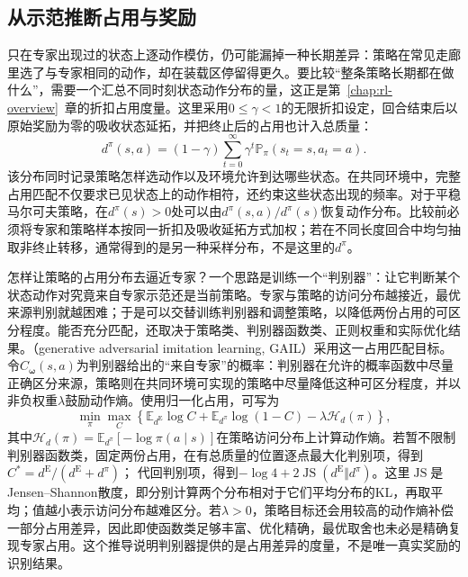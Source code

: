 \subsection{从示范推断占用与奖励}
\label{sec:rl-reward-occupancy-irl}

只在专家出现过的状态上逐动作模仿，仍可能漏掉一种长期差异：策略在常见走廊里选了与专家相同的动作，却在装载区停留得更久。要比较“整条策略长期都在做什么”，需要一个汇总不同时刻状态动作分布的量，这正是第~\ref{chap:rl-overview}~章的折扣占用度量。这里采用$0\leq\gamma<1$的无限折扣设定，回合结束后以原始奖励为零的吸收状态延拓，并把终止后的占用也计入总质量：
\begin{equation}
  d^\pi(s,a)=(1-\gamma)\sum_{t=0}^{\infty}
       \gamma^t\mathbb P_\pi(s_t=s,a_t=a).
  \label{eq:rl-reward-occupancy}
\end{equation}
该分布同时记录策略怎样选动作以及环境允许到达哪些状态。在共同环境中，完整占用匹配不仅要求已见状态上的动作相符，还约束这些状态出现的频率。对于平稳马尔可夫策略，在$d^\pi(s)>0$处可以由$d^\pi(s,a)/d^\pi(s)$恢复动作分布。比较前必须将专家和策略样本按同一折扣及吸收延拓方式加权；若在不同长度回合中均匀抽取非终止转移，通常得到的是另一种采样分布，不是这里的$d^\pi$。

怎样让策略的占用分布去逼近专家？一个思路是训练一个“判别器”：让它判断某个状态动作对究竟来自专家示范还是当前策略。专家与策略的访问分布越接近，最优来源判别就越困难；于是可以交替训练判别器和调整策略，以降低两份占用的可区分程度。能否充分匹配，还取决于策略类、判别器函数类、正则权重和实际优化结果。（generative adversarial imitation learning, GAIL）采用这一占用匹配目标。令$C_{\bm\omega}(s,a)$为判别器给出的“来自专家”的概率：判别器在允许的概率函数中尽量正确区分来源，策略则在共同环境可实现的策略中尽量降低这种可区分程度，并以非负权重$\lambda$鼓励动作熵。使用归一化占用，可写为
\begin{equation}
  \min_\pi\max_C
  \left\{\mathbb E_{d^{\mathrm E}}\log C
    +\mathbb E_{d^\pi}\log(1-C)
    -\lambda\mathcal H_d(\pi)\right\},
  \label{eq:rl-reward-gail}
\end{equation}
其中$\mathcal H_d(\pi)=\mathbb E_{d^\pi}[-\log\pi(a\mid s)]$在策略访问分布上计算动作熵。若暂不限制判别器函数类，固定两份占用，在有总质量的位置逐点最大化判别项，得到
$C^*=d^{\mathrm E}/(d^{\mathrm E}+d^\pi)$；
代回判别项，得到$-\log4+2\operatorname{JS}(d^{\mathrm E}\Vert d^\pi)$。这里$\operatorname{JS}$是Jensen--Shannon散度，即分别计算两个分布相对于它们平均分布的KL，再取平均；值越小表示访问分布越难区分。若$\lambda>0$，策略目标还会用较高的动作熵补偿一部分占用差异，因此即使函数类足够丰富、优化精确，最优取舍也未必是精确复现专家占用。这个推导说明判别器提供的是占用差异的度量，不是唯一真实奖励的识别结果。

